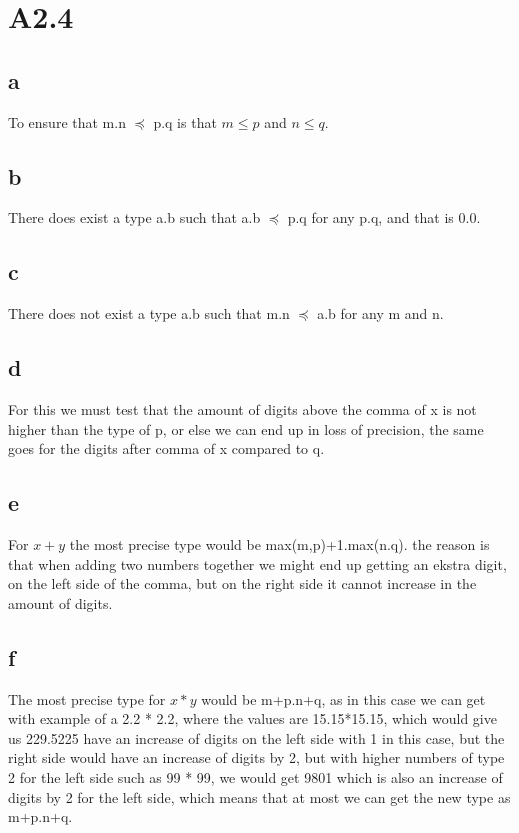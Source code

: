 \documentclass[10pt,a4paper]{article}      %
\begin{document}
\section*{A2.4}
\subsection*{a}
To ensure that m.n $\preceq$ p.q is that $m \leq p$ and $n \leq q$.

\subsection*{b}
There does exist a type a.b such that a.b $\preceq$ p.q for any p.q, and that is 0.0.

\subsection*{c}
There does not exist a type a.b such that m.n $\preceq$ a.b for any m and n.

\subsection*{d}
For this we must test that the amount of digits above the comma of x is not higher than the type of p, or else we can end up in loss of precision, the same goes for the digits after comma of x compared to q.

\subsection*{e}
For $x+y$ the most precise type would be max(m,p)+1.max(n.q). the reason is that when adding two numbers together we might end up getting an ekstra digit, on the left side of the comma, but on the right side it cannot increase in the amount of digits.

\subsection*{f}
The most precise type for $x*y$ would be m+p.n+q, as in this case we can get with example of a 2.2 * 2.2, where the values are 15.15*15.15, which would give us 229.5225 have an increase of digits on the left side with 1 in this case, but the right side would have an increase of digits by 2, but with higher numbers of type 2 for the left side such as 99 * 99, we would get 9801 which is also an increase of digits by 2 for the left side, which means that at most we can get the new type as m+p.n+q.
\end{document}
